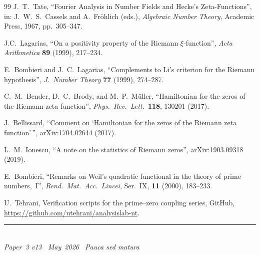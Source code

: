 \documentclass[11pt]{article}
\begin{document}
\begin{thebibliography}{99}
J.~T.~Tate,
``Fourier Analysis in Number Fields and Hecke's Zeta-Functions'',
in: J.~W.~S.~Cassels and A.~Fr\"ohlich (eds.),
\emph{Algebraic Number Theory},
Academic Press, 1967, pp.~305--347.

J.C.~Lagarias,
``On a positivity property of the Riemann $\xi$-function'',
\emph{Acta Arithmetica} \textbf{89} (1999), 217--234.

E.~Bombieri and J.~C.~Lagarias,
``Complements to Li's criterion for the Riemann hypothesis'',
\textit{J.\ Number Theory} \textbf{77} (1999), 274--287.

C.~M.~Bender, D.~C.~Brody, and M.~P.~M\"uller,
``Hamiltonian for the zeros of the Riemann zeta function'',
\textit{Phys.\ Rev.\ Lett.}\ \textbf{118}, 130201 (2017).

J.~Bellissard,
``Comment on `Hamiltonian for the zeros of the Riemann zeta function'\,'',
arXiv:1704.02644 (2017).

L.~M.~Ionescu,
``A note on the statistics of Riemann zeros'',
arXiv:1903.09318 (2019).

E.~Bombieri,
``Remarks on Weil's quadratic functional in the theory of prime
numbers,~I'',
\textit{Rend.\ Mat.\ Acc.\ Lincei}, Ser.~IX,
\textbf{11} (2000), 183--233.

U.~Tehrani,
Verification scripts for the prime--zero coupling series,
GitHub, \url{https://github.com/utehrani/analysislab-nt}.

\end{thebibliography}


\enlargethispage{3\baselineskip}
\vspace*{\fill}
\begin{minipage}{\linewidth}
\rule{\linewidth}{0.4pt}\smallskip\\
\small\emph{Paper~3 v13 \textperiodcentered\ May~2026
\textperiodcentered\ Pauca sed matura}
\end{minipage}
\end{document}
